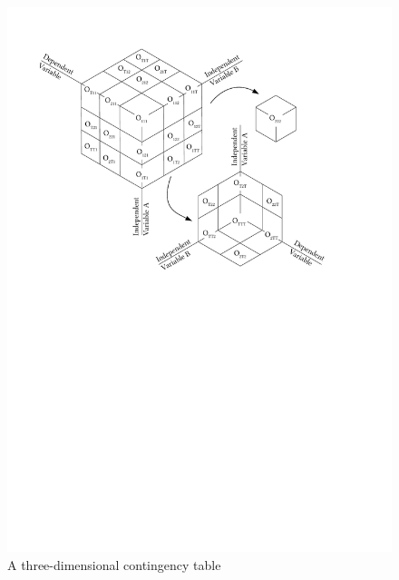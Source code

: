 \begin{figure}[p]
\caption{A three\hyp{}dimensional contingency table}
\label{fig:cfaschematic}
\includegraphics[width=\textwidth,keepaspectratio]{figures/cfaschematic}
\end{figure}

